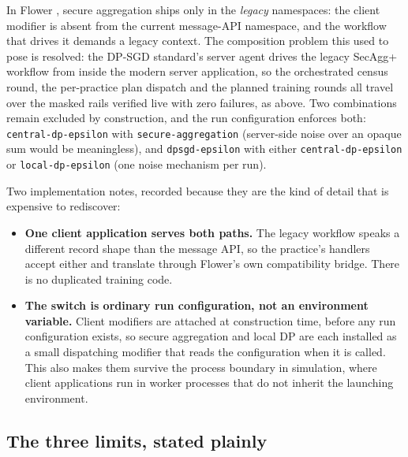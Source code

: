 \begin{table}[htbp]
  \centering
  \caption{Secure-aggregation availability, probed against the installed package rather than
  assumed from documentation.}
  
  \label{tab:secagg}
\end{table}

In Flower \FlwrVersion{}, secure aggregation ships only in the \emph{legacy} namespaces: the client
modifier is absent from the current message-API namespace, and the workflow that drives it demands a
legacy context. The composition problem this used to pose is resolved: the DP-SGD standard's server
agent drives the legacy SecAgg+ workflow from inside the modern server application, so the
orchestrated census round, the per-practice plan dispatch and the planned training rounds all travel
over the masked rails verified live with zero failures, as above. Two combinations remain excluded
by construction, and the run configuration enforces both: \texttt{central-dp-epsilon} with
\texttt{secure-aggregation} (server-side noise over an opaque sum would be meaningless), and
\texttt{dpsgd-epsilon} with either \texttt{central-dp-epsilon} or \texttt{local-dp-epsilon} (one
noise mechanism per run).

Two implementation notes, recorded because they are the kind of detail that is expensive to
rediscover:

\begin{itemize}
  \item \textbf{One client application serves both paths.} The legacy workflow speaks a different
        record shape than the message API, so the practice's handlers accept either and translate
        through Flower's own compatibility bridge. There is no duplicated training code.
  \item \textbf{The switch is ordinary run configuration, not an environment variable.} Client
        modifiers are attached at construction time, before any run configuration exists, so secure
        aggregation and local DP are each installed as a small dispatching modifier that reads the
        configuration when it is called. This also makes them survive the process boundary in
        simulation, where client applications run in worker processes that do not inherit the
        launching environment.
\end{itemize}

\subsection{The three limits, stated plainly}

